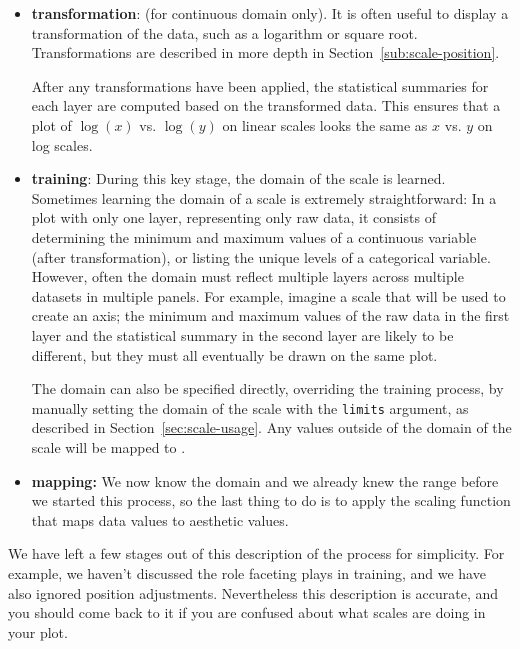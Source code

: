 \begin{itemize}

  \item {\bf transformation}: (for continuous domain only). It is often useful to display a transformation of the data, such as a logarithm or square root. Transformations are described in more depth in Section~\ref{sub:scale-position}.

  After any transformations have been applied, the statistical summaries for each layer are computed based on the transformed data. This ensures that a plot of $\log(x)$ vs. $\log(y)$ on linear scales looks the same as $x$ vs. $y$ on log scales.

  \item {\bf training}:  During this key stage, the domain of the scale is learned.  Sometimes learning the domain of a scale is extremely straightforward: In a plot with only one layer, representing only raw data, it consists of determining the minimum and maximum values of a continuous variable (after transformation), or listing the unique levels of a categorical variable.  However, often the domain must reflect multiple layers across multiple datasets in multiple panels.  For example, imagine a scale that will be used to create an axis; the minimum and maximum values of the raw data in the first layer and the statistical summary in the second layer are likely to be different, but they must all eventually be drawn on the same plot.

  The domain can also be specified directly, overriding the training process, by manually setting the domain of the scale with the {\tt limits} argument, as described in Section~\ref{sec:scale-usage}.  Any values outside of the domain of the scale will be mapped to .

  \item {\bf mapping:}  We now know the domain and we already knew the range before we started this process, so the last thing to do is to apply the scaling function that maps data values to aesthetic values. 

\end{itemize}

We have left a few stages out of this description of the process for simplicity.  For example, we haven't discussed the role faceting plays in training, and we have also ignored position adjustments.  Nevertheless this description is accurate, and you should come back to it if you are confused about what scales are doing in your plot.

